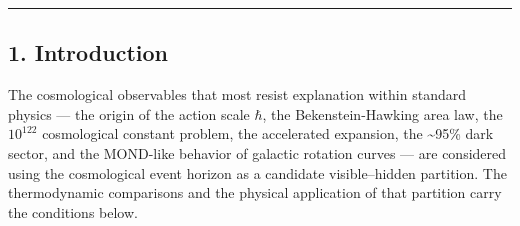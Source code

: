 \documentclass[
]{article}
\begin{document}
\begin{center}\rule{0.5\linewidth}{0.5pt}\end{center}

\hypertarget{introduction}{%
\subsection{1. Introduction}\label{introduction}}

The cosmological observables that most resist explanation within
standard physics --- the origin of the action scale \(\hbar\), the
Bekenstein-Hawking area law, the \(10^{122}\) cosmological constant
problem, the accelerated expansion, the \textasciitilde95\% dark sector,
and the MOND-like behavior of galactic rotation curves --- are
considered using the cosmological event horizon as a candidate
visible--hidden partition. The thermodynamic comparisons and the
physical application of that partition carry the conditions below.
\end{document}
